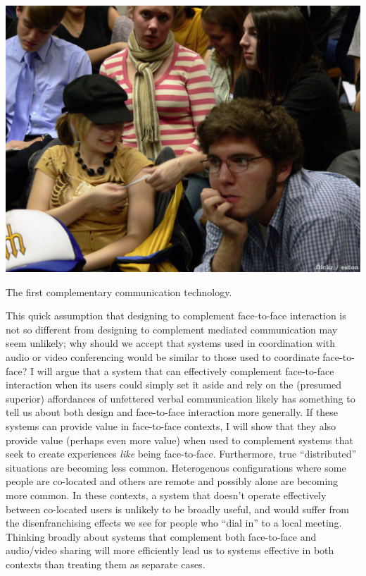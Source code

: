 \begin{marginfigure}
	\includegraphics{figures/note-passing.png}
	\caption{The first complementary communication technology.}
	\label{fig:notes}
\end{marginfigure}


This quick assumption that designing to complement face-to-face interaction is not so different from designing to complement mediated communication may seem unlikely; why should we accept that systems used in coordination with audio or video conferencing would be similar to those used to coordinate face-to-face? I will argue that a system that can effectively complement face-to-face interaction when its users could simply set it aside and rely on the (presumed superior) affordances of unfettered verbal communication likely has something to tell us about both design and face-to-face interaction more generally. If these systems can provide value in face-to-face contexts, I will show that they also provide value (perhaps even more value) when used to complement systems that seek to create experiences \emph{like} being face-to-face. Furthermore, true ``distributed'' situations are becoming less common. Heterogenous configurations where some people are co-located and others are remote and possibly alone are becoming more common. In these contexts, a system that doesn't operate effectively between co-located users is unlikely to be broadly useful, and would suffer from the disenfranchising effects we see for people who ``dial in'' to a local meeting. Thinking broadly about systems that complement both face-to-face and audio/video sharing will more efficiently lead us to systems effective in both contexts than treating them as separate cases.

